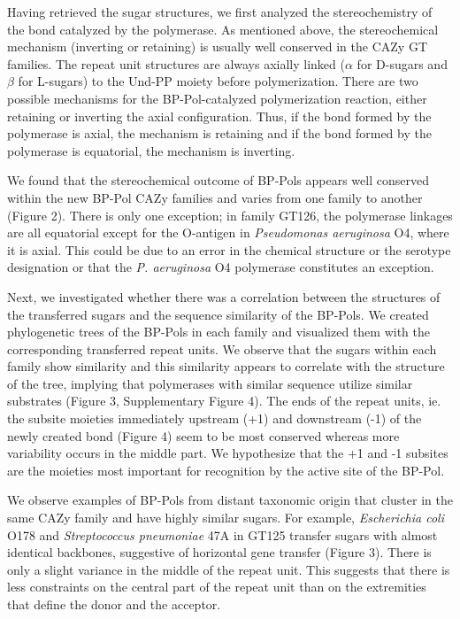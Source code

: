 \documentclass{article}
\begin{document}
Having retrieved the sugar structures, we first analyzed the stereochemistry of the bond catalyzed by the polymerase. As mentioned above, the stereochemical mechanism (inverting or retaining) is usually well conserved in the CAZy GT families. The repeat unit structures are always axially linked ($\alpha$ for D-sugars and $\beta$ for L-sugars) to the Und-PP moiety before polymerization. There are two possible mechanisms for the BP-Pol-catalyzed polymerization reaction, either retaining or inverting the axial configuration. Thus, if the bond formed by the polymerase is axial, the mechanism is retaining and if the bond formed by the polymerase is equatorial, the mechanism is inverting.

We found that the stereochemical outcome of BP-Pols appears well conserved within the new BP-Pol CAZy families and varies from one family to another (Figure 2). There is only one exception; in family GT126, the polymerase linkages are all equatorial except for the O-antigen in \textit{Pseudomonas aeruginosa} O4, where it is axial. This could be due to an error in the chemical structure or the serotype designation or that the \textit{P. aeruginosa} O4 polymerase constitutes an exception.

Next, we investigated whether there was a correlation between the structures of the transferred sugars and the sequence similarity of the BP-Pols. We created phylogenetic trees of the BP-Pols in each family and visualized them with the corresponding transferred repeat units. We observe that the sugars within each family show similarity and this similarity appears to correlate with the structure of the tree, implying that polymerases with similar sequence utilize similar substrates (Figure 3, Supplementary Figure 4). The ends of the repeat units, ie. the subsite moieties immediately upstream (+1) and downstream (-1) of the newly created bond (Figure 4) seem to be most conserved whereas more variability occurs in the middle part. We hypothesize that the +1 and -1 subsites are the moieties most important for recognition by the active site of the BP-Pol.

We observe examples of BP-Pols from distant taxonomic origin that cluster in the same CAZy family and have highly similar sugars. For example, \textit{Escherichia coli} O178 and \textit{Streptococcus pneumoniae} 47A in GT125 transfer sugars with almost identical backbones, suggestive of horizontal gene transfer (Figure 3). There is only a slight variance in the middle of the repeat unit. This suggests that there is less constraints on the central part of the repeat unit than on the extremities that define the donor and the acceptor.
\end{document}
